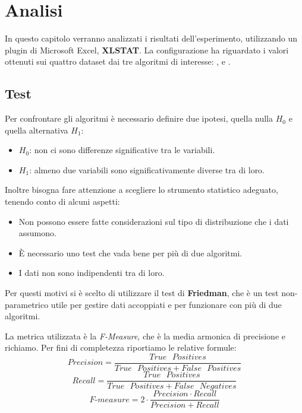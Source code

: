 \chapter{Analisi}

\normalsize
In questo capitolo verranno analizzati i risultati dell'esperimento, utilizzando un plugin di Microsoft Excel, \textbf{XLSTAT}. La configurazione ha riguardato i valori ottenuti sui quattro dataset dai tre algoritmi di interesse: ,  e .

\section{Test}

Per confrontare gli algoritmi è necessario definire due ipotesi, quella nulla $H_0$ e quella alternativa $H_1$:

\begin{itemize}
	\item $H_0$: non ci sono differenze significative tra le variabili.
	\item $H_1$: almeno due variabili sono significativamente diverse tra di loro.
\end{itemize}

\noindent
Inoltre bisogna fare attenzione a scegliere lo strumento statistico adeguato, tenendo conto di alcuni aspetti:
\begin{itemize}
	\item Non possono essere fatte considerazioni sul tipo di distribuzione che i dati assumono.
	\item È necessario uno test che vada bene per più di due algoritmi.
	\item I dati non sono indipendenti tra di loro.
\end{itemize}

Per questi motivi si è scelto di utilizzare il test di \textbf{Friedman}, che è un test non-parametrico utile per gestire dati accoppiati e per funzionare con più di due algoritmi\cite{Demsar:2006:SCC:1248547.1248548}.

La metrica utilizzata è la \emph{F-Measure}, che è la media armonica di precisione e richiamo. Per fini di completezza riportiamo le relative formule:
$$Precision = \frac{True\mbox{ }Positives}{True\mbox{ }Positives + False\mbox{ }Positives}$$
$$Recall = \frac{True\mbox{ }Positives}{True\mbox{ }Positives + False\mbox{ }Negatives}$$
$$ F\mbox{-}measure = 2 \cdot \frac{Precision \cdot Recall}{Precision + Recall} $$


